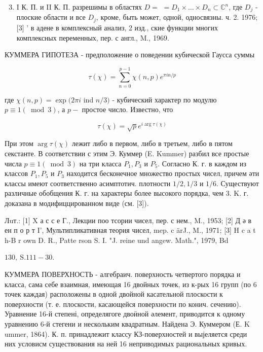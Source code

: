 \documentclass[10pt]{article}
\begin{document}
\begin{enumerate}

  \setcounter{enumi}{2}

  \item I К. П. и II К. П. разрешимы в областях $D=$ $=D_{1} \times \ldots \times D_{n} \subset \mathbb{C}^{n}$, где $D_{j}$ - плоские области и все $D_{j}$, кроме, быть может, одной, односвязны. ч. 2. 1976; [3] ' в адене в комплексный анализ, 2 изд., ские функции многих комплексных переменных, пер. с англ., M., 1969.

\end{enumerate}



КУММЕРА ГИПОТЕЗА - предположение о поведении кубической Гаусса суммы



\[

\tau(\chi)=\sum_{n=0}^{p-1} \chi(n, p) e^{\pi i n / p}

\]



где $\chi(n, p)=\exp (2 \pi i$ ind $n / 3)$ - кубический характер по модулю $p \equiv 1(\bmod 3)$, а $p-$ простое число. Известно, что



\[

\tau(\chi)=\sqrt{p} e^{i \arg \tau(\chi)}

\]



При этом $\arg \tau(\chi)$ лежит либо в первом, либо в третьем, либо в пятом секстанте. В соответствии с этим Э. Куммер (E. Kummer) разбил все простые числа $p \equiv 1(\bmod 3)$ на три класса $P_{1}, P_{3}$ и $P_{5}$. Согласно К. г. в каждом из классов $P_{1}, P_{5}$ и $P_{3}$ находится бесконечное множество простых чисел, причем әти классы имеют соответственно асимптотич. плотности $1 / 2,1 / 3$ и $1 / 6$. Существуют различные обобщения К. г. на характеры более высокого порядка, чем 3. K. г. доказана в модифиццированном виде (см. [3]).



Лuт.: [1] X а с с е Г., Лекции поо тсории чисел, пер. с нем., M., 1953; [2] Д ә в ен п о р т I', Мультипликативная теория чисел, mep. c ärJ., M., 1971; [3] H c a t h-B r own D. R., Patte rson S. I. "J. reine und angew. Math.", 1979, Bd

$130, \mathrm{~S} .111-30$.



КУММЕРА ПОВЕРХНОСТЬ - алгебраич. поверхность четвертого порядка и класса, сама себе взаимная, имеющая 16 двойных точек, из к-рых 16 групп (по 6 точек каждая) расположены в одной двойной касательной плоскости к поверхности (т. е. плоскости, касающейся поверхности по конич. сечению). Уравнение 16-й степені, определягоге двоӥной әлемент, приводится к одному уравнению 6-й стегени и нескольким квадратным. Найдена Э. Куммером (Е. K ummer, 1864). К. п. принадлежит классу КЗ-поверхностей и выјеляется среди них условисм существования на ней 16 неприводимых рациональных кривых.
\end{document}
